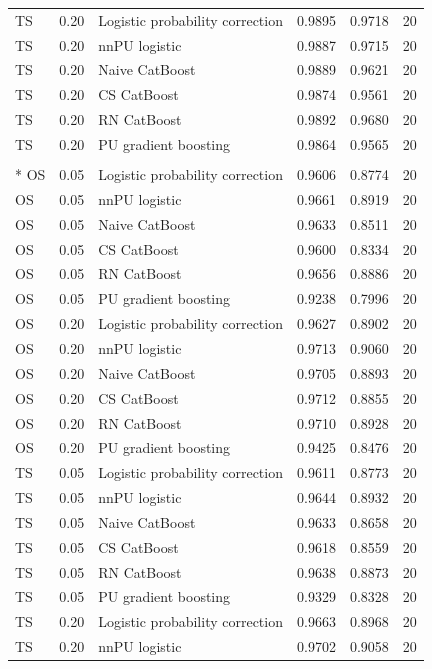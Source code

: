 \begin{longtable}{@{}p{0.65in}rp{2.85in}rrr@{}}
\addlinespace[2pt]
TS & 0.20 & Logistic probability correction & 0.9895 & 0.9718 & 20 \\
TS & 0.20 & nnPU logistic & 0.9887 & 0.9715 & 20 \\
TS & 0.20 & Naive CatBoost & 0.9889 & 0.9621 & 20 \\
TS & 0.20 & CS CatBoost & 0.9874 & 0.9561 & 20 \\
TS & 0.20 & RN CatBoost & 0.9892 & 0.9680 & 20 \\
TS & 0.20 & PU gradient boosting & 0.9864 & 0.9565 & 20 \\
\addlinespace[2pt]
\pagebreak
\multicolumn{6}{l}{\textbf{HTRU2}}\\*
OS & 0.05 & Logistic probability correction & 0.9606 & 0.8774 & 20 \\
OS & 0.05 & nnPU logistic & 0.9661 & 0.8919 & 20 \\
OS & 0.05 & Naive CatBoost & 0.9633 & 0.8511 & 20 \\
OS & 0.05 & CS CatBoost & 0.9600 & 0.8334 & 20 \\
OS & 0.05 & RN CatBoost & 0.9656 & 0.8886 & 20 \\
OS & 0.05 & PU gradient boosting & 0.9238 & 0.7996 & 20 \\
\addlinespace[2pt]
OS & 0.20 & Logistic probability correction & 0.9627 & 0.8902 & 20 \\
OS & 0.20 & nnPU logistic & 0.9713 & 0.9060 & 20 \\
OS & 0.20 & Naive CatBoost & 0.9705 & 0.8893 & 20 \\
OS & 0.20 & CS CatBoost & 0.9712 & 0.8855 & 20 \\
OS & 0.20 & RN CatBoost & 0.9710 & 0.8928 & 20 \\
OS & 0.20 & PU gradient boosting & 0.9425 & 0.8476 & 20 \\
\addlinespace[2pt]
TS & 0.05 & Logistic probability correction & 0.9611 & 0.8773 & 20 \\
TS & 0.05 & nnPU logistic & 0.9644 & 0.8932 & 20 \\
TS & 0.05 & Naive CatBoost & 0.9633 & 0.8658 & 20 \\
TS & 0.05 & CS CatBoost & 0.9618 & 0.8559 & 20 \\
TS & 0.05 & RN CatBoost & 0.9638 & 0.8873 & 20 \\
TS & 0.05 & PU gradient boosting & 0.9329 & 0.8328 & 20 \\
\addlinespace[2pt]
TS & 0.20 & Logistic probability correction & 0.9663 & 0.8968 & 20 \\
TS & 0.20 & nnPU logistic & 0.9702 & 0.9058 & 20 \\

\end{longtable}
